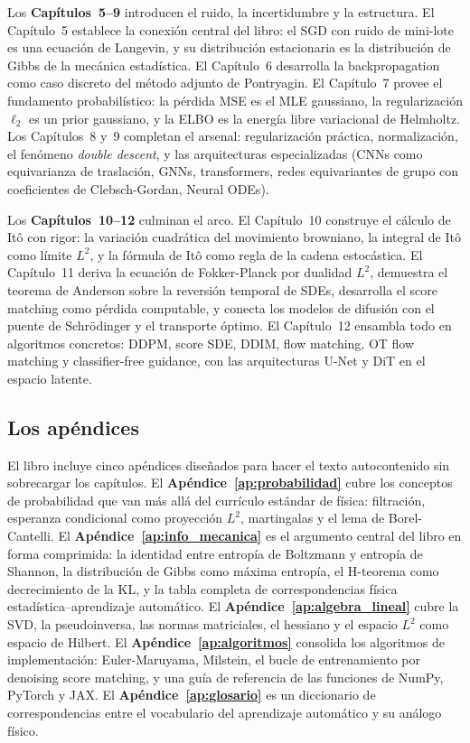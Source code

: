 Los \textbf{Capítulos~5--9} introducen el ruido, la incertidumbre y la
estructura. El Capítulo~5 establece la conexión central del libro: el SGD
con ruido de mini-lote es una ecuación de Langevin, y su distribución
estacionaria es la distribución de Gibbs de la mecánica estadística. El
Capítulo~6 desarrolla la backpropagation como caso discreto del método
adjunto de Pontryagin. El Capítulo~7 provee el fundamento probabilístico:
la pérdida MSE es el MLE gaussiano, la regularización $\ell_2$ es un prior
gaussiano, y la ELBO es la energía libre variacional de Helmholtz. Los
Capítulos~8 y~9 completan el arsenal: regularización práctica, normalización,
el fenómeno \textit{double descent}, y las arquitecturas especializadas
(CNNs como equivarianza de traslación, GNNs, transformers, redes
equivariantes de grupo con coeficientes de Clebsch-Gordan, Neural ODEs).

Los \textbf{Capítulos~10--12} culminan el arco. El Capítulo~10 construye
el cálculo de Itô con rigor: la variación cuadrática del movimiento
browniano, la integral de Itô como límite $L^2$, y la fórmula de Itô como
regla de la cadena estocástica. El Capítulo~11 deriva la ecuación de
Fokker-Planck por dualidad $L^2$, demuestra el teorema de Anderson sobre
la reversión temporal de SDEs, desarrolla el score matching como pérdida
computable, y conecta los modelos de difusión con el puente de Schrödinger
y el transporte óptimo. El Capítulo~12 ensambla todo en algoritmos
concretos: DDPM, score SDE, DDIM, flow matching, OT flow matching y
classifier-free guidance, con las arquitecturas U-Net y DiT en el espacio
latente.

\subsection*{Los apéndices}

El libro incluye cinco apéndices diseñados para hacer el texto
autocontenido sin sobrecargar los capítulos. El
\textbf{Apéndice~\ref{ap:probabilidad}} cubre los conceptos de
probabilidad que van más allá del currículo estándar de física: filtración,
esperanza condicional como proyección $L^2$, martingalas y el lema de
Borel-Cantelli. El \textbf{Apéndice~\ref{ap:info_mecanica}} es el argumento
central del libro en forma comprimida: la identidad entre entropía de
Boltzmann y entropía de Shannon, la distribución de Gibbs como máxima
entropía, el H-teorema como decrecimiento de la KL, y la tabla completa
de correspondencias física estadística--aprendizaje automático. El
\textbf{Apéndice~\ref{ap:algebra_lineal}} cubre la SVD, la pseudoinversa,
las normas matriciales, el hessiano y el espacio $L^2$ como espacio de
Hilbert. El \textbf{Apéndice~\ref{ap:algoritmos}} consolida los algoritmos
de implementación: Euler-Maruyama, Milstein, el bucle de entrenamiento por
denoising score matching, y una guía de referencia de las funciones de
NumPy, PyTorch y JAX. El \textbf{Apéndice~\ref{ap:glosario}} es un
diccionario de correspondencias entre el vocabulario del aprendizaje
automático y su análogo físico.

